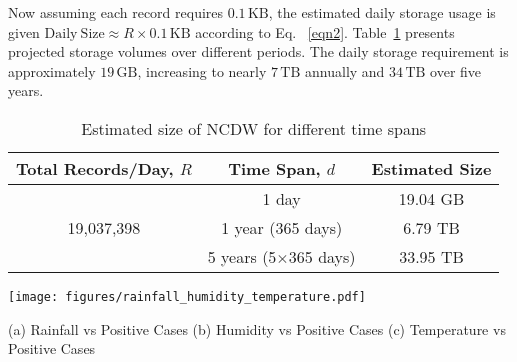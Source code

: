 Now assuming each record requires \(0.1\,\mathrm{KB}\), the estimated daily storage usage is given 
\(\mathrm{Daily\ Size} \approx R \times 0.1\,\mathrm{KB}\) according to Eq. ~\ref{eqn2}. 
Table~\ref{table:size-estimate} presents projected storage volumes over different periods. 
The daily storage requirement is approximately \(19\,\mathrm{GB}\), increasing to nearly \(7\,\mathrm{TB}\) annually and \(34\,\mathrm{TB}\) over five years.

\begin{table}[!h]
\centering
\caption{Estimated size of NCDW for different time spans}
\label{table:size-estimate}
\begin{tabular}{c|c|c}
\toprule
\textbf{Total Records/Day, \(R\)} & \textbf{Time Span, \(d\)} & \textbf{Estimated Size} \\
\hline
\multirow{3}{*}{19,037,398} 
  & 1 day & 19.04 GB  \\ \cline{2-3}
  & 1 year (365 days) & 6.79 TB  \\ \cline{2-3}
  & 5 years (5$\times$365 days) & 33.95 TB  \\ 
\bottomrule
\end{tabular}
\end{table}




    \begin{figure*}[!t]
        \centering
        \texttt{[image: figures/rainfall\_humidity\_temperature.pdf]}
        \vspace{-15pt}
        \begin{center}
           (a) Rainfall vs Positive Cases \hspace{1.5cm} 
           (b) Humidity vs Positive Cases \hspace{1.5cm} 
           (c) Temperature vs Positive Cases
        \end{center}
        \vspace{-4pt}
        \caption{Impact of environmental factors on dengue cases. Rainfall (a) and humidity (b) exhibit a significant correlation with dengue cases, whereas temperature (c) shows no clear correlation.}
        \label{fig:rainfallvshum}
        \vspace{-5mm}
    \end{figure*}



